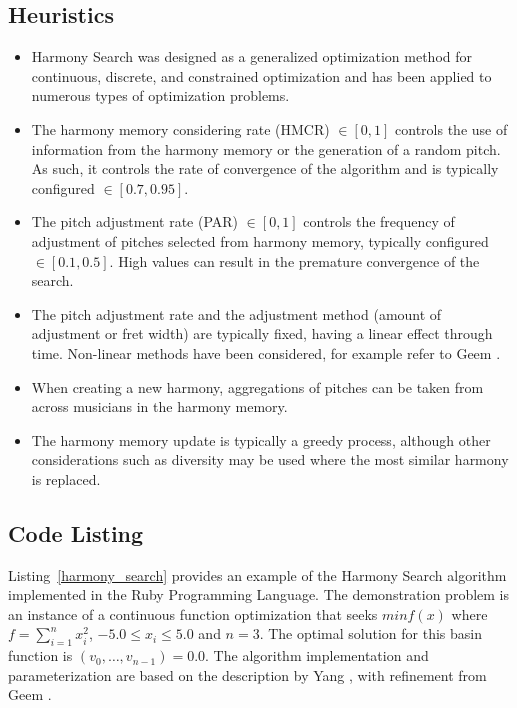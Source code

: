 \subsection{Heuristics}
\begin{itemize}
	\item Harmony Search was designed as a generalized optimization method for continuous, discrete, and constrained optimization and has been applied to numerous types of optimization problems.
	\item The harmony memory considering rate (HMCR) $\in [0,1]$ controls the use of information from the harmony memory or the generation of a random pitch. As such, it controls the rate of convergence of the algorithm and is typically configured $\in [0.7,0.95]$.
	\item The pitch adjustment rate (PAR) $\in [0,1]$ controls the frequency of adjustment of pitches selected from harmony memory, typically configured $\in [0.1,0.5]$. High values can result in the premature convergence of the search.
	\item The pitch adjustment rate and the adjustment method (amount of adjustment or fret width) are typically fixed, having a linear effect through time. Non-linear methods have been considered, for example refer to Geem \cite{Geem2010a}.
	\item When creating a new harmony, aggregations of pitches can be taken from across musicians in the harmony memory.
	\item The harmony memory update is typically a greedy process, although other considerations such as diversity may be used where the most similar harmony is replaced.
\end{itemize}

\subsection{Code Listing}
Listing~\ref{harmony_search} provides an example of the Harmony Search algorithm implemented in the Ruby Programming Language. 
The demonstration problem is an instance of a continuous function optimization that seeks $min f(x)$ where $f=\sum_{i=1}^n x_{i}^2$, $-5.0\leq x_i \leq 5.0$ and $n=3$. The optimal solution for this basin function is $(v_0,\ldots,v_{n-1})=0.0$.
The algorithm implementation and parameterization are based on the description by Yang \cite{Yang2009}, with refinement from Geem \cite{Geem2010a}.

